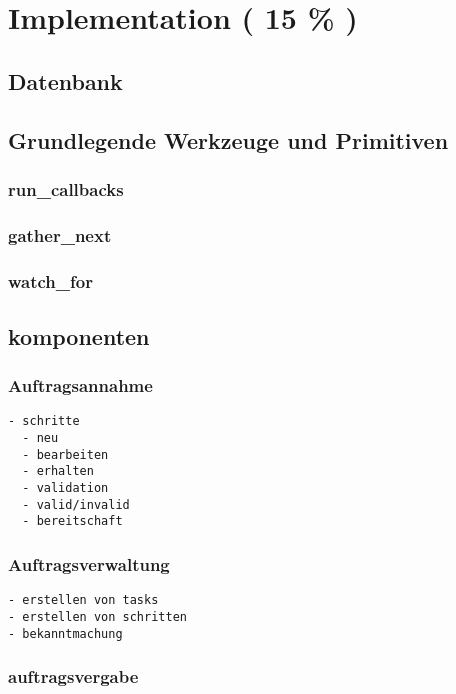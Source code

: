 \chapter{Implementation ( 15 \% ) }



\section{Datenbank}
\section{Grundlegende Werkzeuge und Primitiven}
\subsection{run\_callbacks}
\subsection{gather\_next}
\subsection{watch\_for}

\section{komponenten}

\subsection{Auftragsannahme}

\begin{verbatim}
- schritte
  - neu
  - bearbeiten
  - erhalten
  - validation
  - valid/invalid
  - bereitschaft
\end{verbatim}

\subsection{Auftragsverwaltung}

\begin{verbatim}
- erstellen von tasks
- erstellen von schritten
- bekanntmachung
\end{verbatim}

\subsection{auftragsvergabe}


